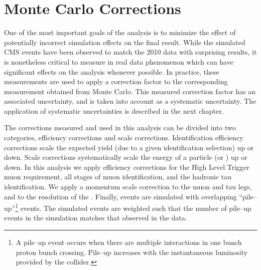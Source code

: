\ifx\master\undefined\fi 
%
\chapter{Monte Carlo Corrections} 
%
\label{ch:corrections} One of the most important goals of the analysis is to
minimize the effect of potentially incorrect simulation effects on the final
result.  While the simulated CMS events have been observed to match the 2010
data with surprising results, it is nonetheless critical to measure in real data
phenomenon which can have significant effects on the analysis whenever possible.
In practice, these measurements are used to apply a correction factor to the
corresponding measurement obtained from Monte Carlo.  This measured correction
factor has an associated uncertainty, and is taken into account as a systematic
uncertainty.  The application of systematic uncertainties is described in the
next chapter.   

The corrections measured and used in this analysis can be divided into two
categories, efficiency corrections and scale corrections. Identification
efficiency corrections scale the expected yield (due to a given identification
selection) up or down.  Scale corrections systematically scale the energy of a
particle (or \MET) up or down.  In this analysis we apply efficiency corrections
for the High Level Trigger muon requirement, all stages of muon identification,
and the hadronic tau identification.  We apply a momentum scale correction to
the muon and tau legs, and to the resolution of the \MET\@.  Finally, events are
simulated with overlapping ``pile--up''\footnote{A pile--up event occurs when
there are multiple interactions in one bunch proton bunch crossing.  Pile--up
increases with the instantaneous luminosity provided by the collider.} events.
The simulated events are weighted such that the number of pile--up events in the
simulation matches that observed in the data.

